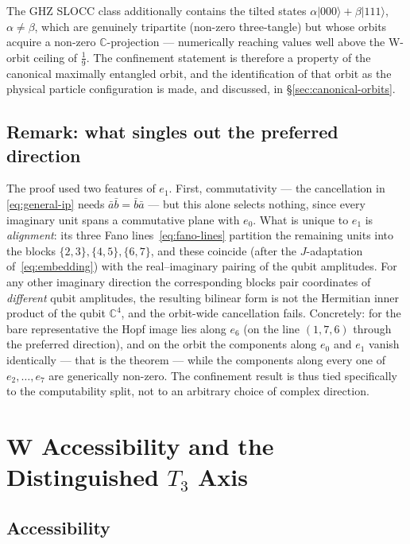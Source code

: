 \begin{remark}
The GHZ SLOCC class additionally contains the tilted states
$\alpha\lvert000\rangle+\beta\lvert111\rangle$, $\alpha\neq\beta$, which are genuinely tripartite
(non-zero three-tangle) but whose orbits acquire a non-zero $\mathbb{C}$-projection --- numerically
reaching values well above the W-orbit ceiling of $\tfrac19$. The confinement statement is therefore
a property of the canonical maximally entangled orbit, and the identification of that orbit as the
physical particle configuration is made, and discussed, in \S\ref{sec:canonical-orbits}.
\end{remark}

\subsection{Remark: what singles out the preferred direction}

The proof used two features of $e_1$. First, commutativity --- the cancellation in
\eqref{eq:general-ip} needs $\bar a\bar b = \bar b\bar a$ --- but this alone selects nothing, since
every imaginary unit spans a commutative plane with $e_0$. What is unique to $e_1$ is
\emph{alignment}: its three Fano lines~\eqref{eq:fano-lines} partition the remaining units into the
blocks $\{2,3\},\{4,5\},\{6,7\}$, and these coincide (after the $J$-adaptation
of~\eqref{eq:embedding}) with the real--imaginary pairing of the qubit amplitudes. For any other
imaginary direction the corresponding blocks pair coordinates of \emph{different} qubit amplitudes,
the resulting bilinear form is not the Hermitian inner product of the qubit $\mathbb{C}^4$, and the
orbit-wide cancellation fails. Concretely: for the bare representative the Hopf image lies along
$e_6$ (on the line $(1,7,6)$ through the preferred direction), and on the orbit the components along
$e_0$ and $e_1$ vanish identically --- that is the theorem --- while the components along every one
of $e_2,\dots,e_7$ are generically non-zero. The confinement result is thus tied specifically to the
computability split, not to an arbitrary choice of complex direction.

\section{W Accessibility and the Distinguished \texorpdfstring{$T_3$}{T3} Axis}
\label{app:w-proof}

\subsection{Accessibility}


